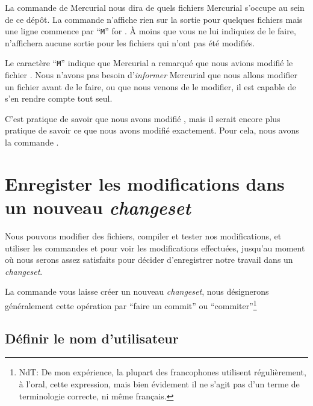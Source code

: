
La commande  de Mercurial nous dira de quels fichiers Mercurial
s'occupe au sein de ce dépôt.
La commande  n'affiche rien sur la sortie pour quelques fichiers
mais une ligne commence par ``\texttt{M}'' for . À moins que
vous ne lui indiquiez de le faire,  n'affichera aucune sortie 
pour les fichiers qui n'ont pas été modifiés.

Le caractère ``\texttt{M}'' indique que Mercurial a remarqué que nous avions
modifié le fichier . Nous n'avons pas besoin d'\emph{informer}
Mercurial que nous allons modifier un fichier avant de le faire, ou que nous 
venons de le modifier, il est capable de s'en rendre compte tout seul.

C'est pratique de savoir que nous avons modifié , mais il
serait encore plus pratique de savoir ce que nous avons modifié exactement. Pour
cela, nous avons la commande  .


\section{Enregister les modifications dans un nouveau \textit{changeset}}

Nous pouvons modifier des fichiers, compiler et tester nos modifications,
et utiliser les commandes  et  pour voir les
modifications effectuées, jusqu'au moment où nous serons assez satisfaits
pour décider d'enregistrer notre travail dans un \textit{changeset}.

La commande  vous laisse créer un nouveau \textit{changeset},
nous désignerons généralement cette opération par ``faire un commit'' ou
``commiter''\footnote{NdT: De mon expérience, la plupart des francophones 
utilisent  régulièrement, à l'oral, cette expression, mais bien évidement
il ne s'agit pas d'un terme de terminologie correcte, ni même français.}

\subsection{Définir le nom d'utilisateur}

